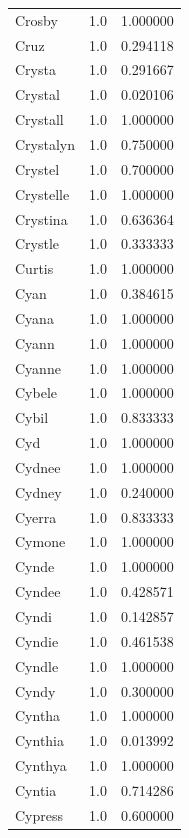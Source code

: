 \documentclass[
  letterpaper,
  DIV=11,
  numbers=noendperiod]{scrreprt}
\begin{document}
\begin{tabular}{lrr}
Crosby          &   1.0 &   1.000000 \\
Cruz            &   1.0 &   0.294118 \\
Crysta          &   1.0 &   0.291667 \\
Crystal         &   1.0 &   0.020106 \\
Crystall        &   1.0 &   1.000000 \\
Crystalyn       &   1.0 &   0.750000 \\
Crystel         &   1.0 &   0.700000 \\
Crystelle       &   1.0 &   1.000000 \\
Crystina        &   1.0 &   0.636364 \\
Crystle         &   1.0 &   0.333333 \\
Curtis          &   1.0 &   1.000000 \\
Cyan            &   1.0 &   0.384615 \\
Cyana           &   1.0 &   1.000000 \\
Cyann           &   1.0 &   1.000000 \\
Cyanne          &   1.0 &   1.000000 \\
Cybele          &   1.0 &   1.000000 \\
Cybil           &   1.0 &   0.833333 \\
Cyd             &   1.0 &   1.000000 \\
Cydnee          &   1.0 &   1.000000 \\
Cydney          &   1.0 &   0.240000 \\
Cyerra          &   1.0 &   0.833333 \\
Cymone          &   1.0 &   1.000000 \\
Cynde           &   1.0 &   1.000000 \\
Cyndee          &   1.0 &   0.428571 \\
Cyndi           &   1.0 &   0.142857 \\
Cyndie          &   1.0 &   0.461538 \\
Cyndle          &   1.0 &   1.000000 \\
Cyndy           &   1.0 &   0.300000 \\
Cyntha          &   1.0 &   1.000000 \\
Cynthia         &   1.0 &   0.013992 \\
Cynthya         &   1.0 &   1.000000 \\
Cyntia          &   1.0 &   0.714286 \\
Cypress         &   1.0 &   0.600000 \\

\end{tabular}
\end{document}
